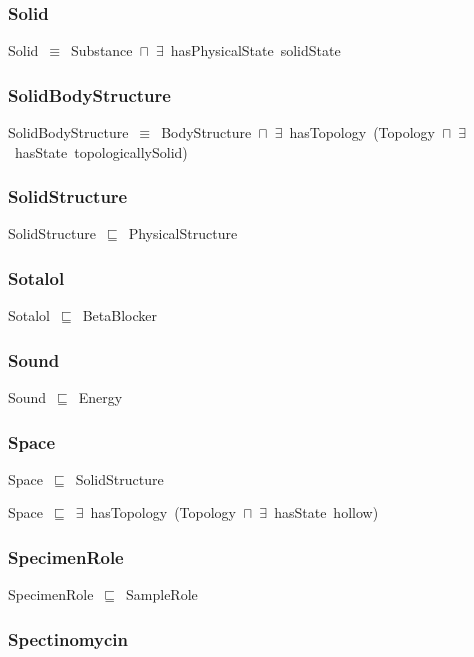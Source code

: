 \documentclass{article}
\begin{document}
\subsubsection*{Solid}

Solid~\ensuremath{\equiv}~Substance~\ensuremath{\sqcap}~\ensuremath{\exists}~hasPhysicalState~solidState

\subsubsection*{SolidBodyStructure}

SolidBodyStructure~\ensuremath{\equiv}~BodyStructure~\ensuremath{\sqcap}~\ensuremath{\exists}~hasTopology~(Topology~\ensuremath{\sqcap}~\ensuremath{\exists}~hasState~topologicallySolid)

\subsubsection*{SolidStructure}

SolidStructure~\ensuremath{\sqsubseteq}~PhysicalStructure~

\subsubsection*{Sotalol}

Sotalol~\ensuremath{\sqsubseteq}~BetaBlocker~

\subsubsection*{Sound}

Sound~\ensuremath{\sqsubseteq}~Energy~

\subsubsection*{Space}

Space~\ensuremath{\sqsubseteq}~SolidStructure~

Space~\ensuremath{\sqsubseteq}~\ensuremath{\exists}~hasTopology~(Topology~\ensuremath{\sqcap}~\ensuremath{\exists}~hasState~hollow)~

\subsubsection*{SpecimenRole}

SpecimenRole~\ensuremath{\sqsubseteq}~SampleRole~

\subsubsection*{Spectinomycin}
\end{document}
